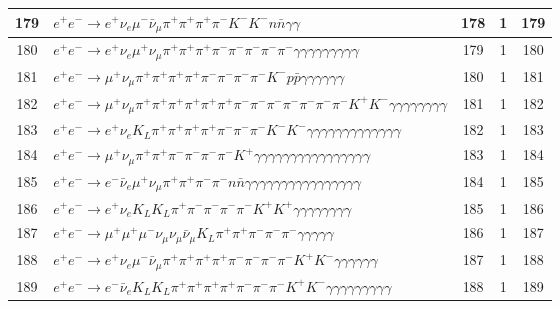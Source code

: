 \documentclass[landscape]{article}
\begin{document}
\begin{table}[htbp!]
\begin{tabular}{|c|>{\centering}p{18cm}|c|c|c|}
\hline
179 & $ e^{+} e^{-} \rightarrow e^{+} \nu_{e} \mu^{-} \bar{\nu}_{\mu} \pi^{+} \pi^{+} \pi^{+} \pi^{-} K^{-} K^{-} n \bar{n} \gamma \gamma $ & 178 & 1 & 179 \\
\hline
180 & $ e^{+} e^{-} \rightarrow e^{+} \nu_{e} \mu^{+} \nu_{\mu} \pi^{+} \pi^{+} \pi^{+} \pi^{-} \pi^{-} \pi^{-} \pi^{-} \pi^{-} \gamma \gamma \gamma \gamma \gamma \gamma \gamma \gamma \gamma $ & 179 & 1 & 180 \\
\hline
181 & $ e^{+} e^{-} \rightarrow \mu^{+} \nu_{\mu} \pi^{+} \pi^{+} \pi^{+} \pi^{+} \pi^{-} \pi^{-} \pi^{-} \pi^{-} K^{-} p \bar{p} \gamma \gamma \gamma \gamma \gamma \gamma $ & 180 & 1 & 181 \\
\hline
182 & $ e^{+} e^{-} \rightarrow \mu^{+} \nu_{\mu} \pi^{+} \pi^{+} \pi^{+} \pi^{+} \pi^{+} \pi^{+} \pi^{-} \pi^{-} \pi^{-} \pi^{-} \pi^{-} \pi^{-} \pi^{-} K^{+} K^{-} \gamma \gamma \gamma \gamma \gamma \gamma \gamma \gamma $ & 181 & 1 & 182 \\
\hline
183 & $ e^{+} e^{-} \rightarrow e^{+} \nu_{e} K_{L} \pi^{+} \pi^{+} \pi^{+} \pi^{+} \pi^{-} \pi^{-} \pi^{-} K^{-} K^{-} \gamma \gamma \gamma \gamma \gamma \gamma \gamma \gamma \gamma \gamma \gamma \gamma \gamma $ & 182 & 1 & 183 \\
\hline
184 & $ e^{+} e^{-} \rightarrow \mu^{+} \nu_{\mu} \pi^{+} \pi^{+} \pi^{-} \pi^{-} \pi^{-} \pi^{-} K^{+} \gamma \gamma \gamma \gamma \gamma \gamma \gamma \gamma \gamma \gamma \gamma \gamma \gamma \gamma \gamma \gamma $ & 183 & 1 & 184 \\
\hline
185 & $ e^{+} e^{-} \rightarrow e^{-} \bar{\nu}_{e} \mu^{+} \nu_{\mu} \pi^{+} \pi^{+} \pi^{-} \pi^{-} n \bar{n} \gamma \gamma \gamma \gamma \gamma \gamma \gamma \gamma \gamma \gamma \gamma \gamma \gamma \gamma \gamma \gamma $ & 184 & 1 & 185 \\
\hline
186 & $ e^{+} e^{-} \rightarrow e^{+} \nu_{e} K_{L} K_{L} \pi^{+} \pi^{-} \pi^{-} \pi^{-} \pi^{-} K^{+} K^{+} \gamma \gamma \gamma \gamma \gamma \gamma \gamma \gamma $ & 185 & 1 & 186 \\
\hline
187 & $ e^{+} e^{-} \rightarrow \mu^{+} \mu^{+} \mu^{-} \nu_{\mu} \nu_{\mu} \bar{\nu}_{\mu} K_{L} \pi^{+} \pi^{+} \pi^{-} \pi^{-} \pi^{-} \gamma \gamma \gamma \gamma \gamma $ & 186 & 1 & 187 \\
\hline
188 & $ e^{+} e^{-} \rightarrow e^{+} \nu_{e} \mu^{-} \bar{\nu}_{\mu} \pi^{+} \pi^{+} \pi^{+} \pi^{+} \pi^{-} \pi^{-} \pi^{-} \pi^{-} K^{+} K^{-} \gamma \gamma \gamma \gamma \gamma \gamma $ & 187 & 1 & 188 \\
\hline
189 & $ e^{+} e^{-} \rightarrow e^{-} \bar{\nu}_{e} K_{L} K_{L} \pi^{+} \pi^{+} \pi^{+} \pi^{+} \pi^{-} \pi^{-} \pi^{-} K^{+} K^{-} \gamma \gamma \gamma \gamma \gamma \gamma \gamma \gamma \gamma $ & 188 & 1 & 189 \\

\end{tabular}
\end{table}
\end{document}
